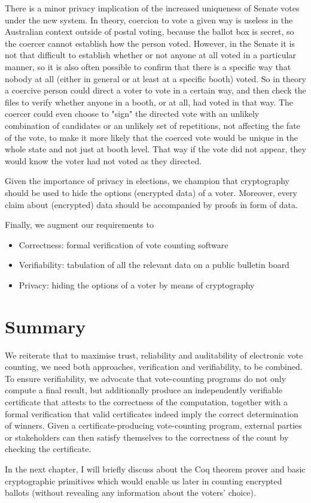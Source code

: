    
   
   \begin{displayquote}
   
   There is a minor privacy implication of the increased uniqueness of Senate votes under the new system.  In theory, coercion to 
   vote a given way is useless in the Australian context outside of postal voting, because the ballot box is secret, so the coercer 
   cannot establish how the person voted.  However, in the Senate it is not that difficult to establish whether or not anyone at all 
   voted in a particular manner, so it is also often possible to confirm that there is a specific way that nobody at all (either in general or 
   at least at a specific booth) voted.   So in theory a coercive person could direct a voter to vote in a certain way, and then check the 
   files to verify whether anyone in a booth, or at all, had voted in that way. The coercer could even choose to "sign" the directed vote 
   with an unlikely combination of candidates or an unlikely set of repetitions, not affecting the fate of the vote, to make it more likely 
   that the coerced vote would be unique in the whole state and not just at booth level.  That way if the vote did not appear, they 
   would know the voter had not voted as they directed.
   
   \end{displayquote}
   
   
   Given the importance of privacy in elections,  we champion that cryptography should be 
   used to hide the options (encrypted data) of a voter.  Moreover, every claim about (encrypted) data 
   should be accompanied by proofs in form of data.  
   
   Finally,  we augment our requirements to
   \begin{itemize}
   \item Correctness: formal verification of vote counting software
   \item Verifiability: tabulation of all the relevant data on a public bulletin board
   \item Privacy: hiding the options of a voter by means of cryptography 
   \end{itemize}
   
\section{Summary}
\label{secback:summary_back}
We reiterate that to maximise trust, reliability and auditability of electronic vote counting, we
need both approaches, verification and verifiability, to be combined. To ensure
verifiability, we advocate that vote-counting programs
do not only compute a final result, but additionally produce an
independently verifiable certificate that attests to the correctness
of the computation, together with a formal verification that
valid certificates indeed imply the correct determination of
winners. Given a certificate-producing vote-counting program, external
parties or stakeholders can then satisfy themselves to the
correctness of the count by checking the certificate.    

In the next chapter, I will  briefly discuss about the Coq theorem prover and basic cryptographic primitives which 
would enable us later in counting encrypted ballots (without revealing any information about the
voters' choice).